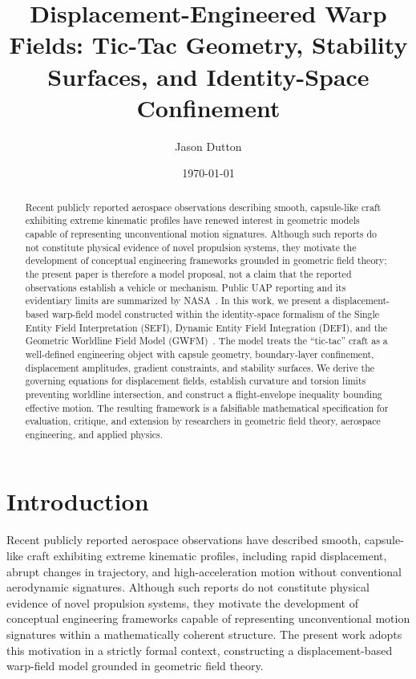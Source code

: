 \documentclass[aip,adv,reprint,floatfix]{revtex4-2}
\begin{document}
\title{Displacement-Engineered Warp Fields: Tic-Tac Geometry, Stability Surfaces, and Identity-Space Confinement}

\author{Jason Dutton}

\date{\today}

\begin{abstract}
Recent publicly reported aerospace observations describing smooth, capsule-like craft exhibiting extreme kinematic profiles have renewed interest in geometric models capable of representing unconventional motion signatures. Although such reports do not constitute physical evidence of novel propulsion systems, they motivate the development of conceptual engineering frameworks grounded in geometric field theory; the present paper is therefore a model proposal, not a claim that the reported observations establish a vehicle or mechanism. Public UAP reporting and its evidentiary limits are summarized by NASA~\cite{NASA2023UAP}. In this work, we present a displacement-based warp-field model constructed within the identity-space formalism of the Single Entity Field Interpretation (SEFI), Dynamic Entity Field Integration (DEFI), and the Geometric Worldline Field Model (GWFM)~\cite{DuttonSEFI2026,DuttonGWFM2026,DuttonUnified2026,DuttonDEFI2026}. The model treats the ``tic-tac'' craft as a well-defined engineering object with capsule geometry, boundary-layer confinement, displacement amplitudes, gradient constraints, and stability surfaces. We derive the governing equations for displacement fields, establish curvature and torsion limits preventing worldline intersection, and construct a flight-envelope inequality bounding effective motion. The resulting framework is a falsifiable mathematical specification for evaluation, critique, and extension by researchers in geometric field theory, aerospace engineering, and applied physics.
\end{abstract}

\maketitle
\section{Introduction}

Recent publicly reported aerospace observations have described smooth, capsule-like craft exhibiting extreme kinematic profiles, including rapid displacement, abrupt changes in trajectory, and high-acceleration motion without conventional aerodynamic signatures. Although such reports do not constitute physical evidence of novel propulsion systems, they motivate the development of conceptual engineering frameworks capable of representing unconventional motion signatures within a mathematically coherent structure. The present work adopts this motivation in a strictly formal context, constructing a displacement-based warp-field model grounded in geometric field theory.
\end{document}

